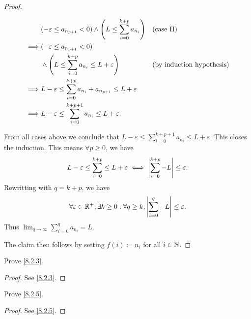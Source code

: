 \begin{proof}
\begin{itemize}
\begin{itemize}
\begin{align*}
                             & (-\varepsilon \leq a_{n_{p + 1}} < 0) \land \Bigg(L \leq \sum_{i = 0}^{k + p} a_{n_i}\Bigg) &  & \text{(case II)} \\
                    \implies & (-\varepsilon \leq a_{n_{p + 1}} < 0)                                                                             \\
                             & \land \Bigg(L \leq \sum_{i = 0}^{k + p} a_{n_i} \leq L + \varepsilon\Bigg)                  &  & \text{(by induction hypothesis)}            \\
                    \implies & L - \varepsilon \leq \sum_{i = 0}^{k + p} a_{n_i} + a_{n_{p + 1}} \leq L + \varepsilon                            \\
                    \implies & L - \varepsilon \leq \sum_{i = 0}^{k + p + 1} a_{n_i} \leq L + \varepsilon.
                  \end{align*}
          \end{itemize}
          From all cases above we conclude that \(L - \varepsilon \leq \sum_{i = 0}^{k + p + 1} a_{n_i} \leq L + \varepsilon\).
          This closes the induction.
          This means \(\forall p \geq 0\), we have
          \[
            L - \varepsilon \leq \sum_{i = 0}^{k + p} \leq L + \varepsilon \iff \left\lvert\sum_{i = 0}^{k + p} - L\right\rvert \leq \varepsilon.
          \]
          Rewritting with \(q = k + p\), we have
          \[
            \forall \varepsilon \in \mathbb{R}^+, \exists k \geq 0 : \forall q \geq k, \left\lvert\sum_{i = 0}^q - L\right\rvert \leq \varepsilon.
          \]
          Thus \(\lim_{q \to \infty} \sum_{i = 0}^q a_{n_i} = L\).
  \end{itemize}
  The claim then follows by setting \(f(i) \coloneqq n_i\) for all \(i \in \mathbb{N}\).
\end{proof}

\exercisesection

\begin{ex}\label{ex:8.2.1}
  Prove \cref{8.2.3}.
\end{ex}

\begin{proof}
  See \cref{8.2.3}.
\end{proof}

\begin{ex}\label{ex:8.2.2}
  Prove \cref{8.2.5}.
\end{ex}

\begin{proof}
  See \cref{8.2.5}.
\end{proof}


